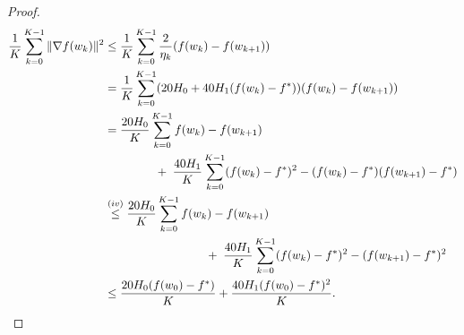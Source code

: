 \documentclass[a4paper,11pt]{article}
\newcommand{\1}{\mathbbm{1}}
\theoremstyle{plain}
\begin{document}
\begin{proof}
    \begin{align*}
        \frac{1}{K}\sum_{k=0}^{K-1}\|\nabla f(w_k)\|^2 & \le \frac{1}{K}\sum_{k=0}^{K-1}\frac{2}{\eta_k}(f(w_k)-f(w_{k+1}))\\
        &= \frac{1}{K}\sum_{k=0}^{K-1}(20H_0 + 40H_1(f(w_k)-f^*))(f(w_k)-f(w_{k+1}))\\
        &= \frac{20H_0}{K}\sum_{k=0}^{K-1}f(w_k)-f(w_{k+1})\\
        &\hspace{1.5cm}+\; \frac{40H_1}{K}\sum_{k=0}^{K-1}(f(w_k)-f^*)^2 - (f(w_k)-f^*)(f(w_{k+1})-f^*)\\
        &\overset{(iv)}{\le} \frac{20H_0}{K}\sum_{k=0}^{K-1}f(w_k)-f(w_{k+1})\\
        &\hspace{3cm}+\; \frac{40H_1}{K}\sum_{k=0}^{K-1}(f(w_k)-f^*)^2 - (f(w_{k+1})-f^*)^2\\
        &\le \frac{20H_0(f(w_0)-f^*)}{K} + \frac{40H_1(f(w_0)-f^*)^2}{K}.
    \end{align*}


\end{proof}
\end{document}
